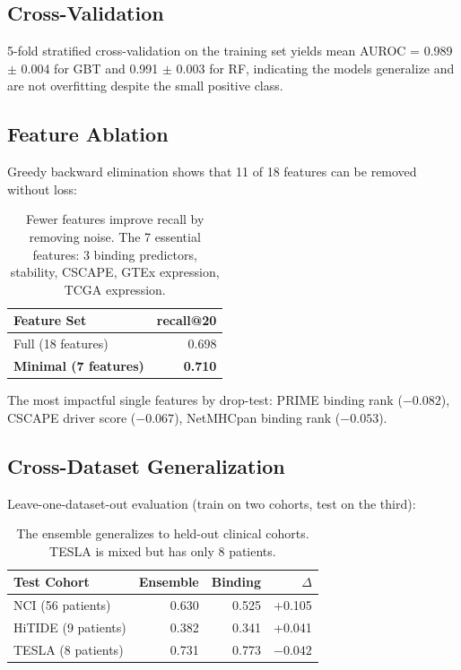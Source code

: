 \documentclass[11pt,twocolumn]{article}
\begin{document}
\subsection{Cross-Validation}

5-fold stratified cross-validation on the training set yields mean AUROC = 0.989 $\pm$ 0.004 for GBT and 0.991 $\pm$ 0.003 for RF, indicating the models generalize and are not overfitting despite the small positive class.

\subsection{Feature Ablation}

Greedy backward elimination shows that 11 of 18 features can be removed without loss:

\begin{table}[ht]
\centering
\footnotesize
\begin{tabular}{@{}lr@{}}
\toprule
Feature Set & recall@20 \\
\midrule
Full (18 features) & 0.698 \\
\textbf{Minimal (7 features)} & \textbf{0.710} \\
\bottomrule
\end{tabular}
\caption{Fewer features improve recall by removing noise. The 7 essential features: 3 binding predictors, stability, CSCAPE, GTEx expression, TCGA expression.}
\end{table}

The most impactful single features by drop-test: PRIME binding rank ($-0.082$), CSCAPE driver score ($-0.067$), NetMHCpan binding rank ($-0.053$).

\subsection{Cross-Dataset Generalization}

Leave-one-dataset-out evaluation (train on two cohorts, test on the third):

\begin{table}[ht]
\centering
\footnotesize
\begin{tabular}{@{}lrrr@{}}
\toprule
Test Cohort & Ensemble & Binding & $\Delta$ \\
\midrule
NCI (56 patients) & 0.630 & 0.525 & +0.105 \\
HiTIDE (9 patients) & 0.382 & 0.341 & +0.041 \\
TESLA (8 patients) & 0.731 & 0.773 & $-0.042$ \\
\bottomrule
\end{tabular}
\caption{The ensemble generalizes to held-out clinical cohorts. TESLA is mixed but has only 8 patients.}
\end{table}
\end{document}
